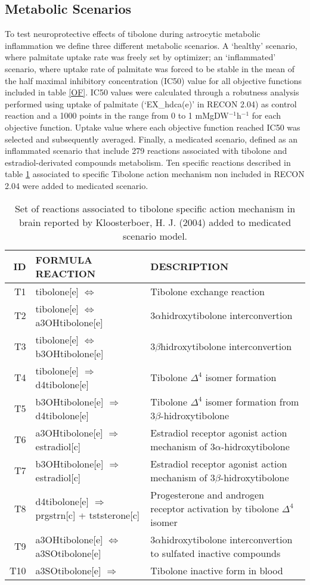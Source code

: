 \subsection*{Metabolic Scenarios}
To test neuroprotective effects of tibolone during astrocytic metabolic inflammation we define three different metabolic scenarios. A `healthy' scenario, where palmitate uptake rate was freely set by optimizer; an `inflammated' scenario, where uptake rate of palmitate was forced to be stable in the mean of the half maximal inhibitory concentration (IC50) value for all objective functions included in table \ref{OF}. IC50 values were calculated through a robutness analysis performed using uptake of palmitate (`EX\_hdca(e)' in RECON 2.04) as control reaction and a 1000 points in the range from 0 to 1 mMgDW$^{-1}$h$^{-1}$ for each objective function. Uptake value where each objective function reached IC50 was selected and subsequently averaged. Finally, a medicated scenario, defined as an inflammated scenario that include 279 reactions associated with tibolone and estradiol-derivated compounds metabolism. Ten specific reactions described in table \ref{Tibolone} associated to specific Tibolone action mechanism non included in RECON 2.04 were added to medicated scenario.
\begin{table}[h]
\caption{Set of reactions associated to tibolone specific action mechanism in brain reported by Kloosterboer, H. J. (2004) added to medicated scenario model.}
\label{Tibolone}
\begin{center}
\begin{tabular}{rlm{7cm}}
\hline
ID & FORMULA REACTION & DESCRIPTION \\
\hline
\hline
T1 & tibolone[e] $\Leftrightarrow$ & Tibolone exchange reaction\\
T2 & tibolone[e] $\Leftrightarrow$ a3OHtibolone[e] & 3$\alpha$hidroxytibolone interconvertion\\
T3 & tibolone[e] $\Leftrightarrow$ b3OHtibolone[e] & 3$\beta$hidroxytibolone interconvertion \\
T4 & tibolone[e] $\Rightarrow$ d4tibolone[e] & Tibolone $\Delta^4$ isomer formation \\
T5 & b3OHtibolone[e] $\Rightarrow$ d4tibolone[e] &  Tibolone $\Delta^4$ isomer formation from 3$\beta$-hidroxytibolone \\
T6 & a3OHtibolone[e] $\Rightarrow$ estradiol[c] & Estradiol receptor agonist action mechanism of 3$\alpha$-hidroxytibolone\\
T7 & b3OHtibolone[e] $\Rightarrow$ estradiol[c] & Estradiol receptor agonist action mechanism of 3$\beta$-hidroxytibolone\\
T8 & d4tibolone[e] $\Rightarrow$ prgstrn[c] + tststerone[c] & Progesterone and androgen receptor activation by tibolone $\Delta^4$ isomer\\
T9 & a3OHtibolone[e] $\Leftrightarrow$ a3SOtibolone[e] & 3$\alpha$hidroxytibolone interconvertion to sulfated inactive compounds \\
T10 & a3SOtibolone[e] $\Rightarrow$ & Tibolone inactive form in blood \\ 
\hline
\end{tabular}
\end{center}
\end{table} 
